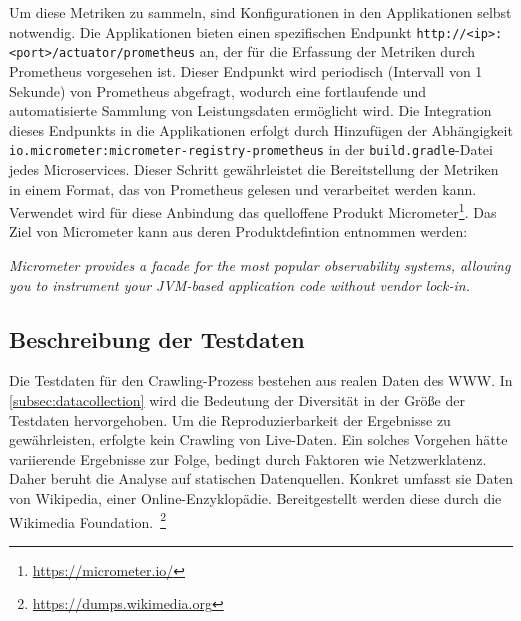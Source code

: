 Um diese Metriken zu sammeln, sind Konfigurationen in den Applikationen selbst notwendig. Die Applikationen bieten einen spezifischen Endpunkt \lstinline{http://<ip>:<port>/actuator/prometheus} an, der für die Erfassung der Metriken durch Prometheus vorgesehen ist. Dieser Endpunkt wird periodisch (Intervall von 1 Sekunde) von Prometheus abgefragt, wodurch eine fortlaufende und automatisierte Sammlung von Leistungsdaten ermöglicht wird. Die Integration dieses Endpunkts in die Applikationen erfolgt durch Hinzufügen der Abhängigkeit \lstinline{io.micrometer:micrometer-registry-prometheus} in der \lstinline{build.gradle}-Datei jedes Microservices. Dieser Schritt gewährleistet die Bereitstellung der Metriken in einem Format, das von Prometheus gelesen und verarbeitet werden kann. Verwendet wird für diese Anbindung das quelloffene Produkt Micrometer\footnote{\url{https://micrometer.io/}}. Das Ziel von Micrometer kann aus deren Produktdefintion entnommen werden:

\begin{spar}
\textit{Micrometer provides a facade for the most popular observability systems, allowing you to instrument your JVM-based application code without vendor lock-in.~\parencite[][]{micrometer}}
\end{spar}

\subsection{Beschreibung der Testdaten}\label{sec:testdaten}
Die Testdaten für den Crawling-Prozess bestehen aus realen Daten des \ac{WWW}. In \ref{subsec:datacollection} wird die Bedeutung der Diversität in der Größe der Testdaten hervorgehoben. Um die Reproduzierbarkeit der Ergebnisse zu gewährleisten, erfolgte kein Crawling von Live-Daten. Ein solches Vorgehen hätte variierende Ergebnisse zur Folge, bedingt durch Faktoren wie Netzwerklatenz. Daher beruht die Analyse auf statischen Datenquellen. Konkret umfasst sie Daten von Wikipedia, einer Online-Enzyklopädie. Bereitgestellt werden diese durch die Wikimedia Foundation.~\footnote{\url{https://dumps.wikimedia.org}}

